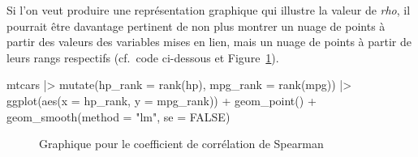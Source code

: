 \documentclass[
  letterpaper,
]{book}
\newenvironment{Shaded}{\begin{snugshade}}{\end{snugshade}}
\newcommand{\AttributeTok}[1]{\textcolor[rgb]{0.40,0.45,0.13}{#1}}
\newcommand{\ConstantTok}[1]{\textcolor[rgb]{0.56,0.35,0.01}{#1}}
\newcommand{\FunctionTok}[1]{\textcolor[rgb]{0.28,0.35,0.67}{#1}}
\newcommand{\NormalTok}[1]{\textcolor[rgb]{0.00,0.23,0.31}{#1}}
\newcommand{\SpecialCharTok}[1]{\textcolor[rgb]{0.37,0.37,0.37}{#1}}
\newcommand{\StringTok}[1]{\textcolor[rgb]{0.13,0.47,0.30}{#1}}
\begin{document}
Si l'on veut produire une représentation graphique qui illustre la
valeur de \emph{rho}, il pourrait être davantage pertinent de non plus
montrer un nuage de points à partir des valeurs des variables mises en
lien, mais un nuage de points à partir de leurs rangs respectifs
(cf.~code ci-dessous et Figure~\ref{fig-graphSpearman}).

\begin{Shaded}
\begin{Highlighting}[]
\NormalTok{mtcars }\SpecialCharTok{|\textgreater{}}
  \FunctionTok{mutate}\NormalTok{(}\AttributeTok{hp\_rank =} \FunctionTok{rank}\NormalTok{(hp), }\AttributeTok{mpg\_rank =} \FunctionTok{rank}\NormalTok{(mpg)) }\SpecialCharTok{|\textgreater{}}
  \FunctionTok{ggplot}\NormalTok{(}\FunctionTok{aes}\NormalTok{(}\AttributeTok{x =}\NormalTok{ hp\_rank, }\AttributeTok{y =}\NormalTok{ mpg\_rank)) }\SpecialCharTok{+}
  \FunctionTok{geom\_point}\NormalTok{() }\SpecialCharTok{+}
  \FunctionTok{geom\_smooth}\NormalTok{(}\AttributeTok{method =} \StringTok{"lm"}\NormalTok{, }\AttributeTok{se =} \ConstantTok{FALSE}\NormalTok{)}
\end{Highlighting}
\end{Shaded}

\begin{figure}[H]


\caption{\label{fig-graphSpearman}Graphique pour le coefficient de
corrélation de Spearman}

\end{figure}%
\end{document}
